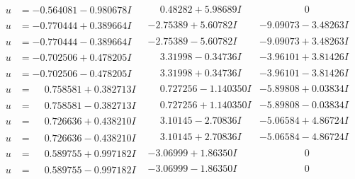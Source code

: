 \documentclass[1p]{elsarticle_modified}
\theoremstyle{definition}
\begin{document}
$$\begin{array}{c|c|c}
\begin{aligned}
u &= -0.564081 - 0.980678 I\end{aligned}
 & \phantom{-}0.48282 + 5.98689 I & \phantom{-0.000000 } 0 \\ \hline\begin{aligned}
u &= -0.770444 + 0.389664 I\end{aligned}
 & -2.75389 + 5.60782 I & -9.09073 - 3.48263 I \\ \hline\begin{aligned}
u &= -0.770444 - 0.389664 I\end{aligned}
 & -2.75389 - 5.60782 I & -9.09073 + 3.48263 I \\ \hline\begin{aligned}
u &= -0.702506 + 0.478205 I\end{aligned}
 & \phantom{-}3.31998 - 0.34736 I & -3.96101 + 3.81426 I \\ \hline\begin{aligned}
u &= -0.702506 - 0.478205 I\end{aligned}
 & \phantom{-}3.31998 + 0.34736 I & -3.96101 - 3.81426 I \\ \hline\begin{aligned}
u &= \phantom{-}0.758581 + 0.382713 I\end{aligned}
 & \phantom{-}0.727256 - 1.140350 I & -5.89808 + 0.03834 I \\ \hline\begin{aligned}
u &= \phantom{-}0.758581 - 0.382713 I\end{aligned}
 & \phantom{-}0.727256 + 1.140350 I & -5.89808 - 0.03834 I \\ \hline\begin{aligned}
u &= \phantom{-}0.726636 + 0.438210 I\end{aligned}
 & \phantom{-}3.10145 - 2.70836 I & -5.06584 + 4.86724 I \\ \hline\begin{aligned}
u &= \phantom{-}0.726636 - 0.438210 I\end{aligned}
 & \phantom{-}3.10145 + 2.70836 I & -5.06584 - 4.86724 I \\ \hline\begin{aligned}
u &= \phantom{-}0.589755 + 0.997182 I\end{aligned}
 & -3.06999 + 1.86350 I & \phantom{-0.000000 } 0 \\ \hline\begin{aligned}
u &= \phantom{-}0.589755 - 0.997182 I\end{aligned}
 & -3.06999 - 1.86350 I & \phantom{-0.000000 } 0 \\ \hline\begin{aligned}

\end{aligned}
\end{array}$$
\end{document}
